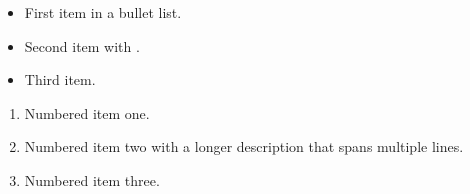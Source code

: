 \documentclass{article}
\begin{document}
\lipsum[1]

\begin{itemize}
  \item First item in a bullet list.
  \item Second item with \lipsum[3][1].
  \item Third item.
\end{itemize}

\lipsum[4]

\begin{enumerate}
  \item Numbered item one.
  \item Numbered item two with a longer description
        that spans multiple lines.
  \item Numbered item three.
\end{enumerate}

\lipsum[5][1-3]
\end{document}
